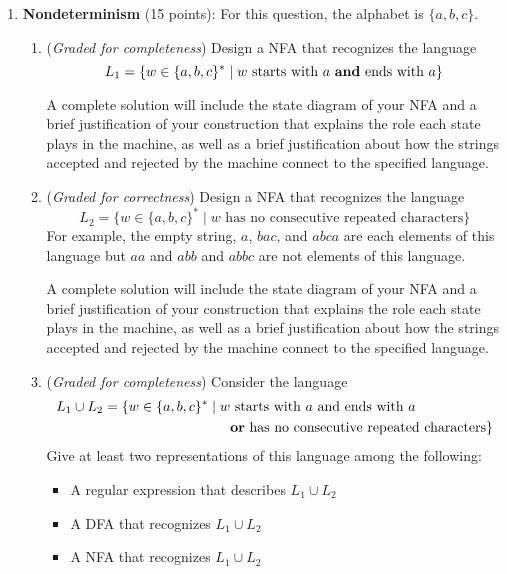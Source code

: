 \documentclass[12pt, oneside]{article}
\newcommand{\gradeCorrect}{({\it Graded for correctness}) }
\newcommand{\gradeComplete}{({\it Graded for completeness}) }
\begin{document}
\begin{enumerate}[wide, labelwidth=!, labelindent=0pt]
\begin{enumerate}
    {\it Hint: sometimes rewriting the defining membership condition for a set in different ways helps us find alternate representations of that set.}
    \end{enumerate}


\item \textbf{Nondeterminism} (15 points): For this question, the alphabet is $\{a,b,c\}$.
\begin{enumerate}
\item\gradeComplete Design a NFA that recognizes the language
    \[ 
    L_1 = \{w \in \{a,b,c\}^* \mid w \text{ starts with $a$ {\bf and} ends with $a$}\}
    \]

    A complete solution will include the state diagram of your NFA and 
    a brief justification 
    of your construction that explains the role each state plays in the machine, as well as a brief 
    justification about how the strings accepted and rejected by the machine connect to the specified language.

\item\gradeCorrect Design a NFA that recognizes the language 
    \[ 
    L_2 = \{w \in \{a,b,c\}^* \mid w \text{ has no consecutive repeated characters}\}
    \]
    For example, the empty string, $a$, $bac$, and $abca$ are each elements of this language but $aa$ and $abb$ and $abbc$ are not elements of this language.

    A complete solution will include the state diagram of your NFA and 
    a brief justification 
    of your construction that explains the role each state plays in the machine, as well as a brief 
    justification about how the strings accepted and rejected by the machine connect to the specified language.

\item\gradeComplete Consider the language
\begin{align*}
L_1 \cup L_2 = \{w \in \{a,b,c\}^* \mid w &\text{ starts with $a$ and ends with $a$} \\
&\text{{\bf or} has no consecutive repeated characters}\}
\end{align*}
Give at least two representations of this language among the following: 
\begin{itemize}
\item A regular expression that describes $L_1 \cup L_2$
\item A DFA that recognizes $L_1 \cup L_2$
\item A NFA that recognizes $L_1 \cup L_2$
\end{itemize}


\end{enumerate}
\end{enumerate}
\end{document}
